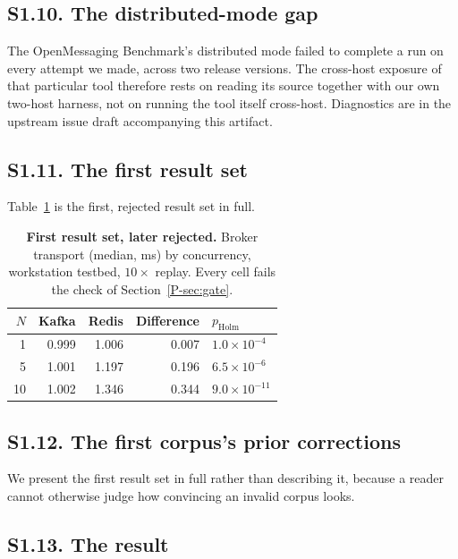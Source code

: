 \documentclass[10pt,journal,onecolumn]{IEEEtran}
\newcommand{\kafka}{Kafka}
\newcommand{\redis}{Redis}
\newcommand{\mainGate}{\ref{P-sec:gate}}            %
\begin{document}
\subsection{S1.10. The distributed-mode gap}
\label{sec:extdist}

The OpenMessaging Benchmark's distributed mode failed to complete a run on every attempt we
made, across two release versions. The cross-host exposure of that particular tool therefore
rests on reading its source together with our own two-host harness, not on running the tool
itself cross-host. Diagnostics are in the upstream issue draft accompanying this artifact.



\subsection{S1.11. The first result set}
Table~\ref{tab:first} is the first, rejected result set in full.



\begin{table}[t]
\caption[First result set, later rejected]{\textbf{First result set, later rejected.} Broker transport (median, ms) by
concurrency, workstation testbed, $10\times$ replay. Every cell fails the check of Section~\mainGate{}.}
\label{tab:first}
\begin{tabular}{rrrrl}
\toprule
$N$ & \kafka{} & \redis{} & Difference & $p_{\text{Holm}}$ \\
\midrule
1  & 0.999 & 1.006 & 0.007 & $1.0\times10^{-4}$ \\
5  & 1.001 & 1.197 & 0.196 & $6.5\times10^{-6}$ \\
10 & 1.002 & 1.346 & 0.344 & $9.0\times10^{-11}$ \\
\bottomrule
\end{tabular}
\end{table}


\subsection{S1.12. The first corpus's prior corrections}
We present the first result set in full rather than describing it, because a reader cannot
otherwise judge how convincing an invalid corpus looks.

\subsection{S1.13. The result}
\end{document}
